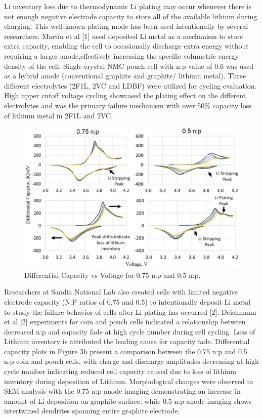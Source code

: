 \documentclass{article}
\begin{document}
Li inventory loss due to thermodynamic Li plating may occur whenever there is not enough negative electrode capacity to store all of the available lithium during charging.  This well-known plating mode has been used intentionally by several researchers.  Martin et al [1] used deposited Li metal as a mechanism to store extra capacity, enabling the cell to occasionally discharge extra energy without requiring a larger anode,effectively increasing the specific volumetric energy density of the cell. Single crystal NMC pouch cell with n:p value of 0.6 was used as a hybrid anode (conventional graphite and graphite/ lithium metal). Three different electrolytes (2F1L, 2VC and LDBF) were utilized for cycling evaluation. High upper cutoff voltage cycling showcased the plating effect on the different electrolytes and was the primary failure mechanism with over 50\% capacity loss of lithium metal in 2F1L and 2VC.  
\begin{figure}
\centering
\includegraphics[scale = 0.4]{images/Differential Capacity vs Voltage.jpg}
\caption{Differential Capacity vs Voltage for 0.75 n:p and 0.5 n:p.}
\label{fig:DiffCapVoltageNP}
\end{figure}
Researchers at Sandia National Lab also created cells with limited negative electrode capacity (N:P ratios of 0.75 and 0.5) to intentionally deposit Li metal to study the failure behavior of cells after Li plating has occurred [2]. Deichmann et al [2] experiments for coin and pouch cells indicated a relationship between decreased n:p and capacity fade at high cycle number during cell cycling. Loss of Lithium inventory is attributed the leading cause for capacity fade. Differential capacity plots in Figure 3b present a comparison between the 0.75 n:p and 0.5 n:p coin and pouch cells, with charge and discharge amplitudes decreasing at high cycle number indicating reduced cell capacity caused due to loss of lithium inventory during deposition of Lithium. Morphological changes were observed in SEM analysis with the 0.75 n:p anode imaging demonstrating an increase in amount of Li deposition on graphite surface, while 0.5 n:p anode imaging shows intertwined dendrites spanning entire graphite electrode. 
\end{document}
